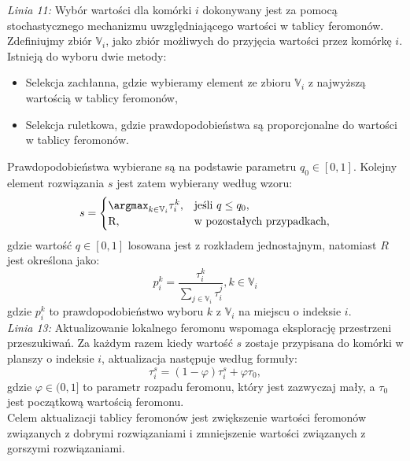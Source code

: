 \documentclass[11pt]{scrartcl} %
\begin{document}
\textit{Linia 11:} Wybór wartości dla komórki $i$ dokonywany jest za pomocą stochastycznego mechanizmu uwzględniającego wartości w tablicy feromonów. Zdefiniujmy zbiór $\mathbb{V}_i$, jako zbiór możliwych do przyjęcia wartości przez komórkę $i$. Istnieją do wyboru dwie metody:
\begin{itemize}
	\item Selekcja zachłanna, gdzie wybieramy element ze zbioru $\mathbb{V}_i$ z najwyższą wartością w tablicy feromonów, 
	\item Selekcja ruletkowa, gdzie prawdopodobieństwa są proporcjonalne do wartości w tablicy feromonów. 
\end{itemize}
Prawdopodobieństwa wybierane są na podstawie parametru $ q_0\in{[0,1]} $. Kolejny element rozwiązania $s$ jest zatem wybierany według wzoru:
\begin{equation}
s = \begin{cases}
\argmax_{{k\in\mathbb{V}_i}}{\tau_i^k}, & \text{jeśli $q\leq{q_0}$},\\
$R$, & \text{w pozostałych przypadkach},
\end{cases}
\end{equation}
gdzie wartość $ q \in{[0,1]}$ losowana jest z rozkładem jednostajnym, natomiast $R$ jest określona jako:
\begin{equation}
p_{i}^{k} =
\dfrac{\tau_{i}^{k}}{\sum_{j\in{\mathbb{V}_i}}{\tau_i^j}}, k\in\mathbb{V}_i
\end{equation}
gdzie $p_{i}^{k}$ to prawdopodobieństwo wyboru $k$ z $\mathbb{V}_i$ na miejscu o indeksie $i$.\\

\textit{Linia 13:} Aktualizowanie lokalnego feromonu wspomaga eksplorację przestrzeni przeszukiwań. Za każdym razem kiedy wartość $s$ zostaje przypisana do komórki w planszy o indeksie $i$, aktualizacja następuje według formuły:
\begin{equation}
\tau_i^s = (1 - \varphi)\tau_i^s + \varphi\tau_0,
\end{equation}
gdzie $\varphi \in (0,1]$ to parametr rozpadu feromonu, który jest zazwyczaj mały, a $\tau_0$ jest początkową wartością feromonu.\\


Celem aktualizacji tablicy feromonów jest zwiększenie wartości feromonów związanych z dobrymi rozwiązaniami i zmniejszenie wartości związanych z gorszymi rozwiązaniami.\\
\end{document}
